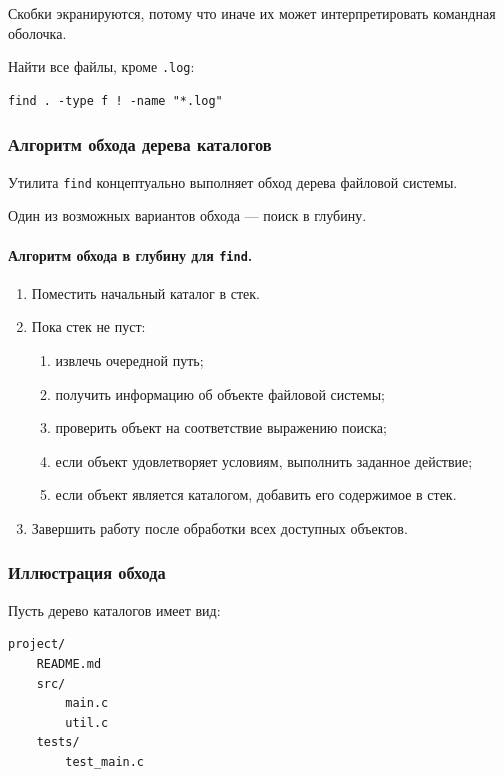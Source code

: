 \documentclass[12pt,a4paper]{article}
\begin{document}
Скобки экранируются, потому что иначе их может интерпретировать командная оболочка.

Найти все файлы, кроме \texttt{.log}:

\begin{verbatim}
find . -type f ! -name "*.log"
\end{verbatim}

\subsubsection{Алгоритм обхода дерева каталогов}

Утилита \texttt{find} концептуально выполняет обход дерева файловой системы.

Один из возможных вариантов обхода --- поиск в глубину.

\paragraph{Алгоритм обхода в глубину для \texttt{find}.}

\begin{enumerate}
    \item Поместить начальный каталог в стек.
    \item Пока стек не пуст:
    \begin{enumerate}
        \item извлечь очередной путь;
        \item получить информацию об объекте файловой системы;
        \item проверить объект на соответствие выражению поиска;
        \item если объект удовлетворяет условиям, выполнить заданное действие;
        \item если объект является каталогом, добавить его содержимое в стек.
    \end{enumerate}
    \item Завершить работу после обработки всех доступных объектов.
\end{enumerate}

\subsubsection{Иллюстрация обхода}

Пусть дерево каталогов имеет вид:

\begin{verbatim}
project/
    README.md
    src/
        main.c
        util.c
    tests/
        test_main.c
\end{verbatim}
\end{document}
